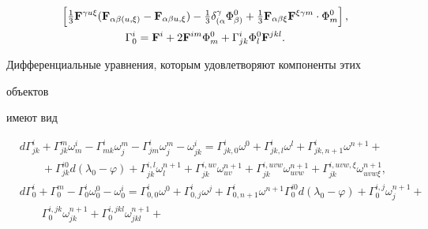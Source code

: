 \begin{notes}
\begin{gather}
\left[\tfrac{1}{3}\bold F^{\gamma u\xi} 


(\bold F_{\alpha\beta(u,\xi)}- 


\bold F_{\alpha\beta u,\xi})- 


\tfrac{1}{3}\delta^\gamma_{(\alpha}\Phi^0_{\beta)}+ 


\tfrac{1}{3}\bold F_{\alpha\beta\xi}\bold F^{\xi\gamma m} 


\cdot\Phi^0_m\right],\\ 


\Gamma^i_0=\bold F^i+2\bold F^{im}\Phi^0_m+ 


\Gamma^i_{jk}\Phi^0_l\bold F^{jkl}. \notag 


\end{gather} 


Дифференциальные уравнения, которым удовлетворяют компоненты этих 


объектов 


имеют вид 


\begin{align*} 


&d\Gamma^i_{jk}+\Gamma^m_{jk}\omega^i_m- 


\Gamma^i_{mk}\omega^m_j-\Gamma^i_{jm}\omega^m_j- 


\omega^i_{jk}=\Gamma^i_{jk,0}\omega^0+\Gamma^i_{jk,l}\omega^l+ 


\Gamma^i_{jk,n+1}\omega^{n+1}+\\ 


&\qquad 


+\Gamma^{i0}_{jk}d(\lambda_0-\varphi)+\Gamma^{i,l}_{jk} 


\omega^{n+1}_l+\Gamma^{i,uv}_{jk}\omega^{n+1}_{uv}+ 


\Gamma^{i,uvw}_{jk}\omega^{n+1}_{uvw}+ 


\Gamma^{i,uvw,\xi}_{jk}\omega^{n+1}_{uvw\xi},\\ 


&d\Gamma^i_0+\Gamma^m_0-\Gamma^i_0\omega^0_0- 


\omega^i_0=\Gamma^i_{0,0}\omega^0 


+\Gamma^i_{0,j}\omega^j+\Gamma^i_{0,n+1}\omega^{n+1} 


\Gamma^{i0}_0 d(\lambda_0-\varphi)+ 


\Gamma^{i,j}_0\omega^{n+1}_j+\\ 


&\qquad 


\Gamma^{i,jk}_0\omega^{n+1}_{jk}+ 


\Gamma^{i,jkl}_0\omega^{n+1}_{jkl}+ 



\end{align*}
\end{notes}
